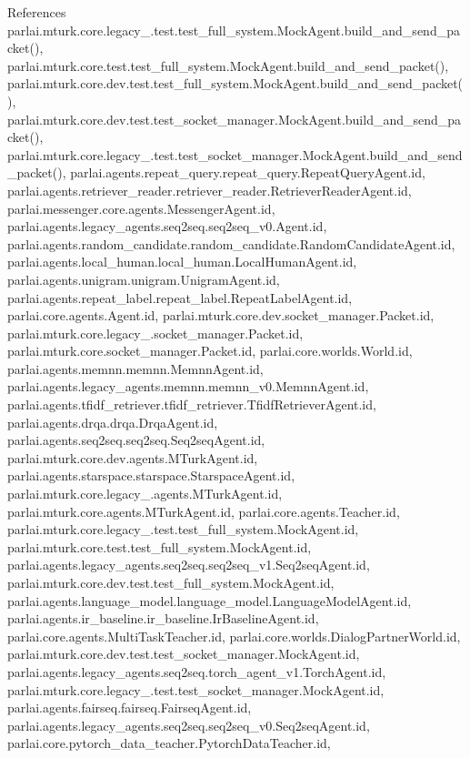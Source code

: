 References parlai.\+mturk.\+core.\+legacy\+\_.\+test.\+test\+\_\+full\+\_\+system.\+Mock\+Agent.\+build\+\_\+and\+\_\+send\+\_\+packet(), parlai.\+mturk.\+core.\+test.\+test\+\_\+full\+\_\+system.\+Mock\+Agent.\+build\+\_\+and\+\_\+send\+\_\+packet(), parlai.\+mturk.\+core.\+dev.\+test.\+test\+\_\+full\+\_\+system.\+Mock\+Agent.\+build\+\_\+and\+\_\+send\+\_\+packet(), parlai.\+mturk.\+core.\+dev.\+test.\+test\+\_\+socket\+\_\+manager.\+Mock\+Agent.\+build\+\_\+and\+\_\+send\+\_\+packet(), parlai.\+mturk.\+core.\+legacy\+\_.\+test.\+test\+\_\+socket\+\_\+manager.\+Mock\+Agent.\+build\+\_\+and\+\_\+send\+\_\+packet(), parlai.\+agents.\+repeat\+\_\+query.\+repeat\+\_\+query.\+Repeat\+Query\+Agent.\+id, parlai.\+agents.\+retriever\+\_\+reader.\+retriever\+\_\+reader.\+Retriever\+Reader\+Agent.\+id, parlai.\+messenger.\+core.\+agents.\+Messenger\+Agent.\+id, parlai.\+agents.\+legacy\+\_\+agents.\+seq2seq.\+seq2seq\+\_\+v0.\+Agent.\+id, parlai.\+agents.\+random\+\_\+candidate.\+random\+\_\+candidate.\+Random\+Candidate\+Agent.\+id, parlai.\+agents.\+local\+\_\+human.\+local\+\_\+human.\+Local\+Human\+Agent.\+id, parlai.\+agents.\+unigram.\+unigram.\+Unigram\+Agent.\+id, parlai.\+agents.\+repeat\+\_\+label.\+repeat\+\_\+label.\+Repeat\+Label\+Agent.\+id, parlai.\+core.\+agents.\+Agent.\+id, parlai.\+mturk.\+core.\+dev.\+socket\+\_\+manager.\+Packet.\+id, parlai.\+mturk.\+core.\+legacy\+\_.\+socket\+\_\+manager.\+Packet.\+id, parlai.\+mturk.\+core.\+socket\+\_\+manager.\+Packet.\+id, parlai.\+core.\+worlds.\+World.\+id, parlai.\+agents.\+memnn.\+memnn.\+Memnn\+Agent.\+id, parlai.\+agents.\+legacy\+\_\+agents.\+memnn.\+memnn\+\_\+v0.\+Memnn\+Agent.\+id, parlai.\+agents.\+tfidf\+\_\+retriever.\+tfidf\+\_\+retriever.\+Tfidf\+Retriever\+Agent.\+id, parlai.\+agents.\+drqa.\+drqa.\+Drqa\+Agent.\+id, parlai.\+agents.\+seq2seq.\+seq2seq.\+Seq2seq\+Agent.\+id, parlai.\+mturk.\+core.\+dev.\+agents.\+M\+Turk\+Agent.\+id, parlai.\+agents.\+starspace.\+starspace.\+Starspace\+Agent.\+id, parlai.\+mturk.\+core.\+legacy\+\_.\+agents.\+M\+Turk\+Agent.\+id, parlai.\+mturk.\+core.\+agents.\+M\+Turk\+Agent.\+id, parlai.\+core.\+agents.\+Teacher.\+id, parlai.\+mturk.\+core.\+legacy\+\_.\+test.\+test\+\_\+full\+\_\+system.\+Mock\+Agent.\+id, parlai.\+mturk.\+core.\+test.\+test\+\_\+full\+\_\+system.\+Mock\+Agent.\+id, parlai.\+agents.\+legacy\+\_\+agents.\+seq2seq.\+seq2seq\+\_\+v1.\+Seq2seq\+Agent.\+id, parlai.\+mturk.\+core.\+dev.\+test.\+test\+\_\+full\+\_\+system.\+Mock\+Agent.\+id, parlai.\+agents.\+language\+\_\+model.\+language\+\_\+model.\+Language\+Model\+Agent.\+id, parlai.\+agents.\+ir\+\_\+baseline.\+ir\+\_\+baseline.\+Ir\+Baseline\+Agent.\+id, parlai.\+core.\+agents.\+Multi\+Task\+Teacher.\+id, parlai.\+core.\+worlds.\+Dialog\+Partner\+World.\+id, parlai.\+mturk.\+core.\+dev.\+test.\+test\+\_\+socket\+\_\+manager.\+Mock\+Agent.\+id, parlai.\+agents.\+legacy\+\_\+agents.\+seq2seq.\+torch\+\_\+agent\+\_\+v1.\+Torch\+Agent.\+id, parlai.\+mturk.\+core.\+legacy\+\_.\+test.\+test\+\_\+socket\+\_\+manager.\+Mock\+Agent.\+id, parlai.\+agents.\+fairseq.\+fairseq.\+Fairseq\+Agent.\+id, parlai.\+agents.\+legacy\+\_\+agents.\+seq2seq.\+seq2seq\+\_\+v0.\+Seq2seq\+Agent.\+id, parlai.\+core.\+pytorch\+\_\+data\+\_\+teacher.\+Pytorch\+Data\+Teacher.\+id, 